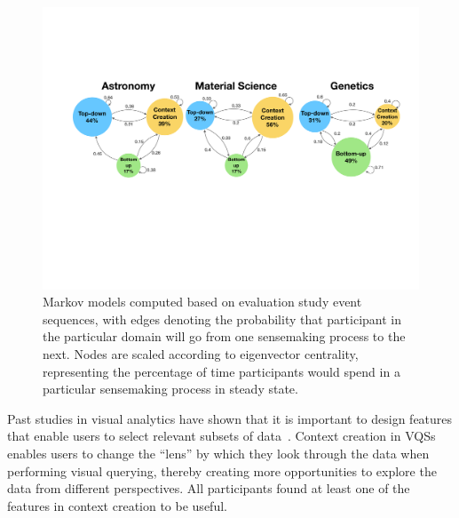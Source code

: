  \begin{figure}[ht!]
   \centering
   \includegraphics[width=0.6\linewidth]{figures/markov_transition.pdf}
   \caption{Markov models computed based on evaluation study event sequences, with edges denoting the probability that participant in the particular domain will go from one sensemaking process to the next. Nodes are scaled according to  eigenvector centrality, representing the percentage of time participants would spend in a particular sensemaking process in steady state. }\label{fig:transition}
   \vspace*{-15pt}
 \end{figure}
 \par Past studies in visual analytics
 have shown that it is important to design features
 that enable users to select relevant subsets of data~\cite{Amar2005,Heer2012}.
 Context creation in VQSs enables users to change the ``lens''
 by which they look through the data
 when performing visual querying,
 thereby creating more opportunities
 to explore the data from different perspectives. All participants found at least
 one of the features in context creation to be useful.
